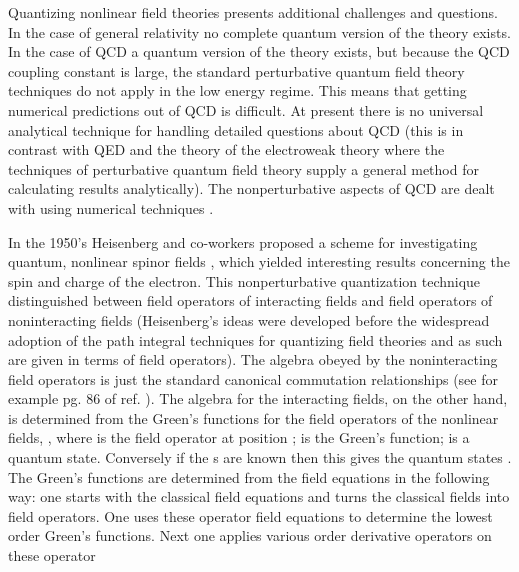 \documentclass[a4paper,aps,showpacs]{revtex4}
\begin{document}
Quantizing nonlinear field theories presents additional
challenges and questions. In the case of general relativity
no complete quantum version of the theory exists. In the case
of QCD a quantum version of the theory exists, but
because the QCD coupling constant is large, the standard perturbative
quantum field theory techniques do not apply in the low energy
regime. This means that
getting numerical predictions out of QCD is difficult. At present
there is no universal analytical technique for handling detailed
questions about QCD (this is in contrast with QED and the theory
of the electroweak theory where the techniques of perturbative
quantum field theory supply a general method for calculating
results analytically). The nonperturbative aspects of QCD are dealt
with using numerical techniques \cite{chernodub}.

In the 1950's Heisenberg and co-workers proposed a scheme for
investigating quantum, nonlinear spinor fields \cite{heisenberg}, which
yielded interesting results concerning the spin
and charge of the electron. This nonperturbative quantization technique
distinguished between field operators of interacting fields and
field operators of noninteracting fields (Heisenberg's ideas
were developed before the widespread adoption of the path
integral techniques for quantizing field theories and as such
are given in terms of field operators). The algebra obeyed by the
noninteracting field operators is just the standard canonical
commutation relationships (see for example pg. 86 of ref.
\cite{mandl}). The algebra for the interacting fields, on the
other hand, is determined from the Green's functions for the
field operators of the nonlinear fields,
\coordHE{},
where \coordHE{} is the field operator at position \coordHE{};
\coordHE{} is the Green's function;
\coordHE{} is a quantum state. Conversely if the
\coordHE{}s are known then this
gives the quantum states \coordHE{}. The Green's functions
are determined from the field equations in the following way:
one starts with the classical field equations and turns the
classical fields into field operators. One uses these
operator field equations to determine the
lowest order Green's functions. Next one applies various order
derivative operators on these operator
\end{document}
